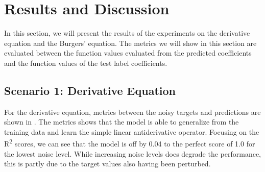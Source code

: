 \documentclass[preprint,12pt,times,authoryear]{elsarticle}
\begin{document}

\section{Results and Discussion}
In this section, we will present the results of the experiments on the derivative equation and the Burgers' equation. The metrics we will show in this section are evaluated between the function values evaluated from the predicted coefficients and the function values of the test label coefficients.

\subsection{Scenario 1: Derivative Equation}
For the derivative equation, metrics between the noisy targets and predictions are shown in . The metrics shows that the model is able to generalize from the training data and learn the simple linear antiderivative operator. Focusing on the R\textsuperscript{2} scores, we can see that the model is off by 0.04 to the perfect score of 1.0 for the lowest noise level. While increasing noise levels does degrade the performance, this is partly due to the target values also having been perturbed.
\end{document}

